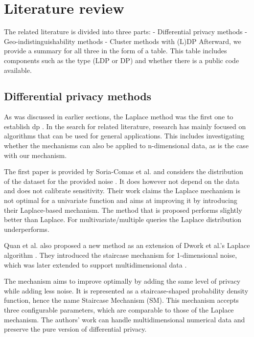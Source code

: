 \section{Literature review}
The related literature is divided into three parts:
- Differential privacy methods
- Geo-indistinguishability methods
- Cluster methods with (L)DP
Afterward, we provide a summary for all three in the form of a table.
This table includes components such as the type (LDP or DP) and whether there is a public code available.

\subsection{Differential privacy methods}
As was discussed in earlier sections, the Laplace method was the first one to establish \gls{dp} \cite{dwork_differential_2006}.
In the search for related literature, research has mainly focused on algorithms that can be used for general applications.
This includes investigating whether the mechanisms can also be applied to n-dimensional data, as is the case with our mechanism.

The first paper is provided by Soria-Comas et al. and considers the distribution of the dataset for the provided noise \cite{soria-comas_optimal_2013}.
It does however not depend on the data and does not calibrate sensitivity.
Their work claims the Laplace mechanism is not optimal for a univariate function and aims at improving it by introducing their Laplace-based mechanism.
The method that is proposed performs slightly better than Laplace.
For multivariate/multiple queries the Laplace distribution underperforms.

Quan et al. also proposed a new method as an extension of Dwork et al.'s Laplace algorithm \citep{geng_staircase_2013}.
They introduced the staircase mechanism for 1-dimensional noise, which was later extended to support multidimensional data \citep{geng_staircase_2015}.

The mechanism aims to improve optimally by adding the same level of privacy while adding less noise.
It is represented as a staircase-shaped probability density function, hence the name Staircase Mechanism (SM).
This mechanism accepts three configurable parameters, which are comparable to those of the Laplace mechanism.
The authors' work can handle multidimensional numerical data and preserve the pure version of differential privacy.

